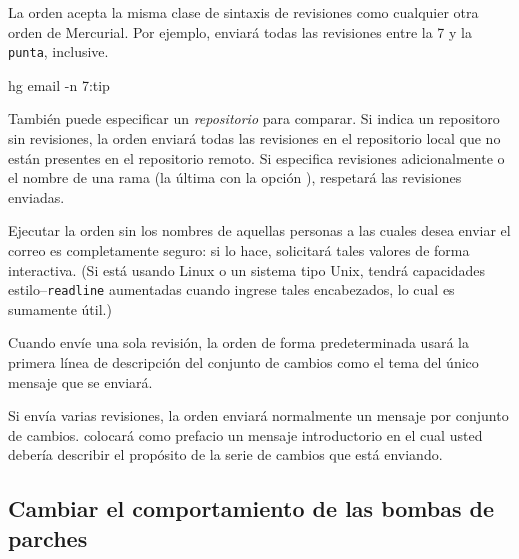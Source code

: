 La orden  acepta la misma clase de sintaxis
de revisiones como cualquier otra orden de Mercurial.  Por ejemplo,
enviará todas las revisiones entre la 7 y la \texttt{punta}, inclusive.
\begin{codesample2}
  hg email -n 7:tip
\end{codesample2}
También puede especificar un \emph{repositorio} para comparar.  Si
indica un repositoro sin revisiones, la orden 
enviará todas las revisiones en el repositorio local que no están
presentes en el repositorio remoto.  Si especifica revisiones
adicionalmente o el nombre de una rama (la última con la opción
), respetará las revisiones enviadas.

Ejecutar la orden  sin los nombres de
aquellas personas a las cuales desea enviar el correo es completamente
seguro: si lo hace, solicitará tales valores de forma interactiva.
(Si está usando Linux o un sistema tipo Unix, tendrá capacidades
estilo--\texttt{readline} aumentadas cuando ingrese tales encabezados,
lo cual es sumamente útil.)

Cuando envíe una sola revisión, la orden 
de forma predeterminada usará la primera línea de descripción del
conjunto de cambios como el tema del único mensaje que se enviará.

Si envía varias revisiones, la orden  enviará
normalmente un mensaje por conjunto de cambios.  colocará como
prefacio un mensaje introductorio en el cual usted debería describir
el propósito de la serie de cambios que está enviando.

\subsection{Cambiar el comportamiento de las bombas de parches}

